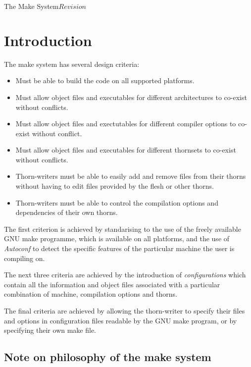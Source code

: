 %   

\begin{cactuspart}{3}{The Make System}{}{$Revision$}
\renewcommand{\thepage}{\Alph{part}\arabic{page}}

\chapter{Introduction}

The make system has several design criteria:

\begin{itemize}
\item
Must be able to build the code on all supported platforms.
\item
Must allow object files and executables for different architectures to 
co-exist without conflicts.
\item{}
Must allow object files and exectutables for different compiler options to
co-exist without conflict.
\item{}
Must allow object files and executables for different thornsets to 
co-exist without conflicts.
\item{}
Thorn-writers must be able to easily add and remove files from their
thorns without having to edit files provided by the flesh or other thorns.
\item{}
Thorn-writers must be able to control the compilation options and 
dependencies of their own thorns.
\end{itemize}

The first criterion is achieved by standarising to the use of the freely
available GNU make programme, which is available on all platforms, and
the use of {\em Autoconf} to detect the specific features of the particular
machine the user is compiling on.

The next three criteria are achieved by the introduction of {\em configurations}
which contain all the information and object files associated with a 
particular combination of machine, compilation options and thorns.

The final criteria are achieved by allowing the thorn-writer to specify their
files and options in configuration files readable by the GNU make program,
or by specifying their own make file.

\section{Note on philosophy of the make system}


\end{cactuspart}
